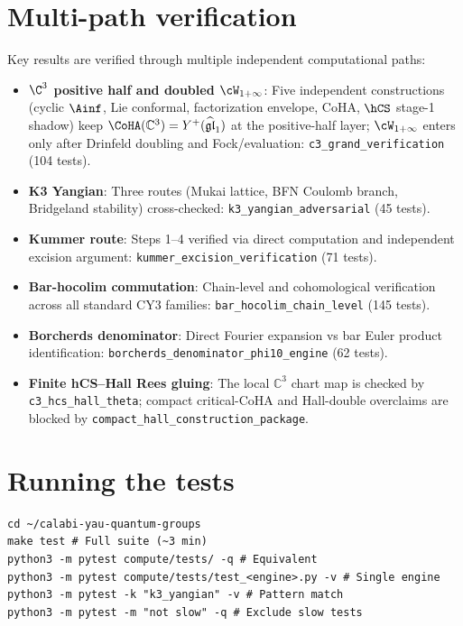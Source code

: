 \section{Multi-path verification}
\label{sec:test-multipath}

Key results are verified through multiple independent computational paths:

\begin{itemize}[nosep]
\item \textbf{$\C^3$ positive half and doubled $\cW_{1+\infty}$}: Five
 independent constructions (cyclic $\Ainf$, Lie conformal,
 factorization envelope, CoHA, $\hCS$ stage-1 shadow) keep
 $\CoHA(\mathbb C^3)=Y^+(\widehat{\mathfrak{gl}}_1)$ at the positive-half
 layer; $\cW_{1+\infty}$ enters only after Drinfeld doubling and
 Fock/evaluation: \texttt{c3\_grand\_verification} (104 tests).

\item \textbf{K3 Yangian}: Three routes (Mukai lattice, BFN Coulomb
 branch, Bridgeland stability) cross-checked:
 \texttt{k3\_yangian\_adversarial} (45 tests).

\item \textbf{Kummer route}: Steps 1--4 verified via direct computation
 and independent excision argument:
 \texttt{kummer\_excision\_verification} (71 tests).

\item \textbf{Bar-hocolim commutation}: Chain-level and cohomological
 verification across all standard CY3 families:
 \texttt{bar\_hocolim\_chain\_level} (145 tests).

\item \textbf{Borcherds denominator}: Direct Fourier expansion vs
 bar Euler product identification:
 \texttt{borcherds\_denominator\_phi10\_engine} (62 tests).

\item \textbf{Finite hCS--Hall Rees gluing}: The local $\mathbb C^3$
 chart map is checked by \texttt{c3\_hcs\_hall\_theta}; compact
 critical-CoHA and Hall-double overclaims are blocked by
 \texttt{compact\_hall\_construction\_package}.
\end{itemize}

\section{Running the tests}
\label{sec:test-running}

\begin{verbatim}
cd ~/calabi-yau-quantum-groups
make test # Full suite (~3 min)
python3 -m pytest compute/tests/ -q # Equivalent
python3 -m pytest compute/tests/test_<engine>.py -v # Single engine
python3 -m pytest -k "k3_yangian" -v # Pattern match
python3 -m pytest -m "not slow" -q # Exclude slow tests
\end{verbatim}

